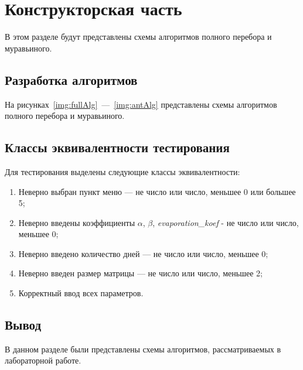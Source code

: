 \chapter{Конструкторская часть}

В этом разделе будут представлены схемы алгоритмов полного перебора и муравьиного.

\section{Разработка алгоритмов}

На рисунках~\ref{img:fullAlg}~---~\ref{img:antAlg} представлены схемы алгоритмов полного перебора и муравьиного.


\newpage
\section{Классы эквивалентности тестирования}

Для тестирования выделены следующие классы эквивалентности:
\begin{enumerate}
	\item Неверно выбран пункт меню --- не число или число, меньшее 0 или большее 5;
	\item Неверно введены коэффициенты $\alpha$, $\beta$, \textit{evaporation\_koef} - не число или число, меньшее 0;
	\item Неверно введено количество дней --- не число или число, меньшее 0;
	\item Неверно введен размер матрицы --- не число или число, меньшее 2;
	\item Корректный ввод всех параметров.
\end{enumerate}

\section{Вывод}

В данном разделе были представлены схемы алгоритмов,  рассматриваемых в лабораторной работе.